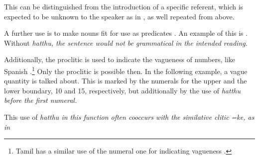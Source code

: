 
This can be distinguished from the introduction of a specific referent, which is expected to be unknown to the speaker as in , as well repeated from above.


A further use is to make nouns fit for use as predicates .
An example of this is . Without \em hatthu, \em the sentence would not be grammatical in the intended reading.


Additionally, the proclitic is used to indicate the vagueness of numbers, like Spanish .\footnote{Tamil has a similar use of the numeral one for indicating vagueness \citep[135]{Schiffman1999}.} Only the proclitic is possible then. In the following example, a vague quantity is talked about. This is marked by the numerals for the upper and the lower boundary, 10 and 15, respectively, but additionally by the use of \em hatthu \em before the first numeral.
 

This use of \em hatthu \em in this function often cooccurs with the similative clitic \em =ke\em, as in 
 
